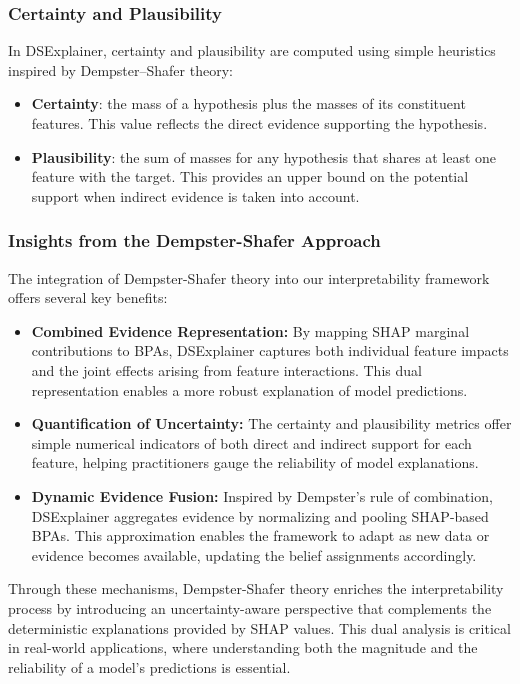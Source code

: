 \documentclass[acmlarge]{acmart}
\begin{document}
\subsubsection{Certainty and Plausibility}

In DSExplainer, certainty and plausibility are computed using simple heuristics inspired by Dempster--Shafer theory:
\begin{itemize}
    \item \textbf{Certainty}: the mass of a hypothesis plus the masses of its constituent features. This value reflects the direct evidence supporting the hypothesis.
    \item \textbf{Plausibility}: the sum of masses for any hypothesis that shares at least one feature with the target. This provides an upper bound on the potential support when indirect evidence is taken into account.
\end{itemize}



\subsubsection{Insights from the Dempster-Shafer Approach}

The integration of Dempster-Shafer theory into our interpretability framework offers several key benefits:
\begin{itemize}
    \item \textbf{Combined Evidence Representation:} By mapping SHAP marginal contributions to BPAs, DSExplainer captures both individual feature impacts and the joint effects arising from feature interactions. This dual representation enables a more robust explanation of model predictions.
    \item \textbf{Quantification of Uncertainty:} The certainty and plausibility metrics offer simple numerical indicators of both direct and indirect support for each feature, helping practitioners gauge the reliability of model explanations.
    \item \textbf{Dynamic Evidence Fusion:} Inspired by Dempster's rule of combination, DSExplainer aggregates evidence by normalizing and pooling SHAP-based BPAs. This approximation enables the framework to adapt as new data or evidence becomes available, updating the belief assignments accordingly.

\end{itemize}

Through these mechanisms, Dempster-Shafer theory enriches the interpretability process by introducing an uncertainty-aware perspective that complements the deterministic explanations provided by SHAP values. This dual analysis is critical in real-world applications, where understanding both the magnitude and the reliability of a model’s predictions is essential.
\end{document}
